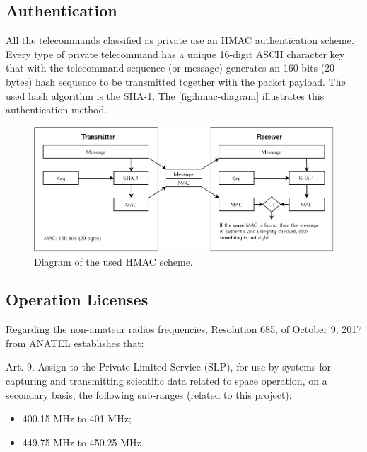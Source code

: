 \subsection{Authentication}

All the telecommands classified as private use an HMAC authentication scheme. Every type of private telecommand has a unique 16-digit ASCII character key that with the telecommand sequence (or message) generates an 160-bits (20-bytes) hash sequence to be transmitted together with the packet payload. The used hash algorithm is the SHA-1. The \autoref{fig:hmac-diagram} illustrates this authentication method.

\begin{figure}[!htb]
    \begin{center}
        \includegraphics[width=\textwidth]{figures/hmac-diagram.pdf}
        \caption{Diagram of the used HMAC scheme.}
        \label{fig:hmac-diagram}
    \end{center}
\end{figure}

\subsection{Operation Licenses}


Regarding the non-amateur radios frequencies, Resolution 685, of October 9, 2017 from ANATEL establishes that:

Art. 9. Assign to the Private Limited Service (SLP), for use by systems for capturing and transmitting scientific data related to space operation, on a secondary basis, the following sub-ranges (related to this project):

\begin{itemize}
\item 400.15 MHz to 401 MHz;
\item 449.75 MHz to 450.25 MHz.
\end{itemize}

